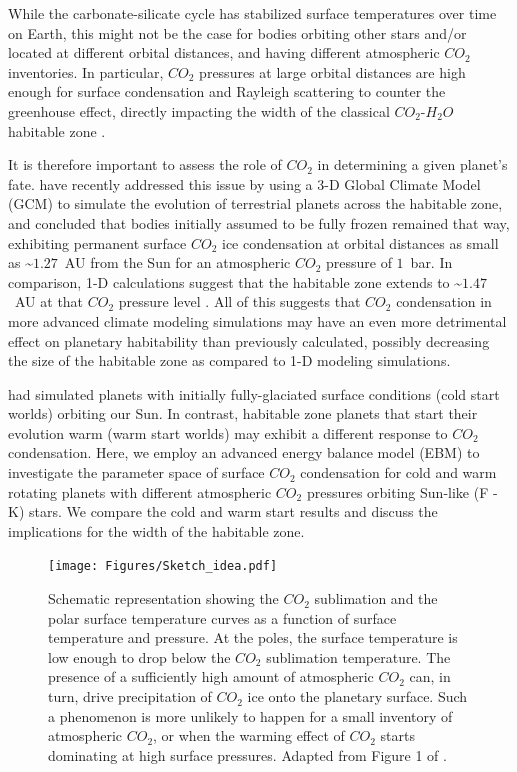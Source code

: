 \documentclass[fleqn,usenatbib]{mnras}
\begin{document}
While the carbonate-silicate cycle has stabilized surface temperatures over time on Earth, this might not be the case for bodies orbiting other stars and/or located at different orbital distances, and having different atmospheric $CO_{\mathrm{2}}$ inventories. In particular, $CO_{\mathrm{2}}$ pressures at large orbital distances are high enough for surface condensation and Rayleigh scattering to counter the greenhouse effect, directly impacting the width of the classical $CO_{\mathrm{2}}$-$H_{\mathrm{2}}O$ habitable zone \citep{kasting1993,KumarKopparapu2013, Ramirez2018}. 

It is therefore important to assess the role of $CO_{\mathrm{2}}$ in determining a given planet's fate. \citet{Turbet2017} have recently addressed this issue by using a 3-D Global Climate Model (GCM) to simulate the evolution of terrestrial planets across the habitable zone, and concluded that bodies initially assumed to be fully frozen remained that way, exhibiting permanent surface $CO_{\mathrm{2}}$ ice condensation at orbital distances as small as \textasciitilde $1.27$~AU from the Sun for an atmospheric $CO_{\mathrm{2}}$ pressure of $1$~bar. In comparison, 1-D calculations suggest that the habitable zone extends to \textasciitilde $1.47$~AU at that $CO_{\mathrm{2}}$ pressure level \citep{kasting1993,KumarKopparapu2013, Ramirez2018}. 
All of this suggests that $CO_{\mathrm{2}}$ condensation in more advanced climate modeling simulations may have an even more detrimental effect on planetary habitability than previously calculated, possibly decreasing the size of the habitable zone as compared to 1-D modeling simulations.

\citet{Turbet2017} had simulated planets with initially fully-glaciated surface conditions (cold start worlds) orbiting our Sun. In contrast, habitable zone planets that start their evolution warm (warm start worlds) may exhibit a different response to $CO_{\mathrm{2}}$ condensation. Here, we employ an advanced energy balance model (EBM) to investigate the parameter space of surface $CO_{\mathrm{2}}$ condensation for cold and warm rotating planets with different atmospheric $CO_{\mathrm{2}}$ pressures orbiting Sun-like (F - K) stars. We compare the cold and warm start results and discuss the implications for the width of the habitable zone.

\begin{figure}
	\texttt{[image: Figures/Sketch\_idea.pdf]}
    \caption{Schematic representation showing the $CO_{\mathrm{2}}$ sublimation and the polar surface temperature curves as a function of surface temperature and pressure. At the poles, the surface temperature is low enough to drop below the $CO_{\mathrm{2}}$ sublimation temperature. The presence of a sufficiently high amount of atmospheric $CO_{\mathrm{2}}$ can, in turn, drive precipitation of $CO_{\mathrm{2}}$ ice onto the planetary surface. 
    Such a phenomenon is more unlikely to happen for a small inventory of atmospheric $CO_{\mathrm{2}}$, or when the warming effect of $CO_{\mathrm{2}}$ starts dominating at high surface pressures. Adapted from Figure 1 of \citet{Soto2015}.}
    \label{fig:Sketch}
\end{figure}
\end{document}
